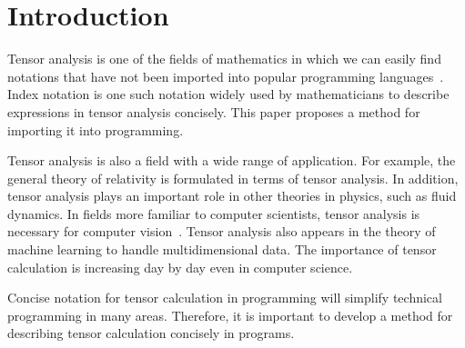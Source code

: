 \documentclass[acmlarge]{acmart}
\begin{document}


\maketitle
\thispagestyle{firstfancy}

\section{Introduction}\label{intro}

Tensor analysis is one of the fields of mathematics in which we can easily find notations that have not been imported into popular programming languages~\cite{fleisch2011student,schutz1980geometrical}.
Index notation is one such notation widely used by mathematicians to describe expressions in tensor analysis concisely.
This paper proposes a method for importing it into programming.

Tensor analysis is also a field with a wide range of application.
For example, the general theory of relativity is formulated in terms of tensor analysis.
In addition, tensor analysis plays an important role in other theories in physics, such as fluid dynamics.
In fields more familiar to computer scientists, tensor analysis is necessary for computer vision~\cite{hartley2003multiple}.
Tensor analysis also appears in the theory of machine learning to handle multidimensional data.
The importance of tensor calculation is increasing day by day even in computer science.

Concise notation for tensor calculation in programming will simplify technical programming in many areas.
Therefore, it is important to develop a method for describing tensor calculation concisely in programs.

\end{document}
